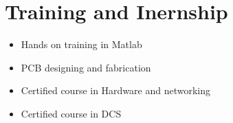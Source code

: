 \documentclass{My_CV_Class}
\begin{document}
\section{Training and Inernship}
\begin{itemize}
	\item Hands on training in Matlab
	\item PCB designing and fabrication
	\item Certified course in Hardware and networking
	\item Certified course in DCS
\end{itemize}
\end{document}
